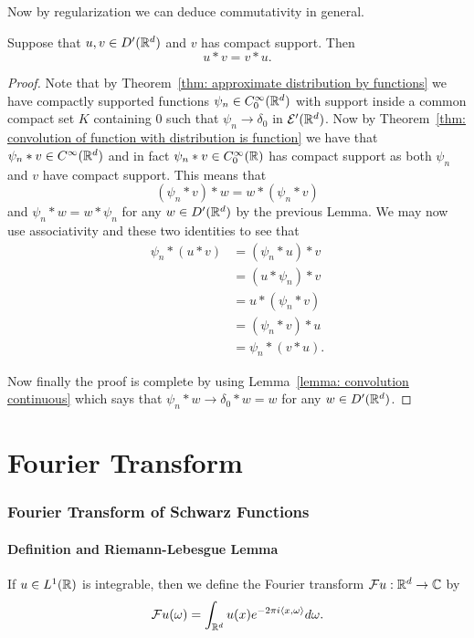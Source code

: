 \documentclass[twoside, a4paper, 10pt]{amsart}
\begin{document}
Now by regularization we can deduce commutativity in general.

\begin{thm}[Commutativity] Suppose that $u,v \in D'(\mathbb{R}^d)$ and $v$ has compact support. Then $$u*v = v*u.$$

\end{thm}

\begin{proof} Note that by Theorem~\ref{thm: approximate distribution by functions} we have compactly supported functions $\psi_n \in C_0^{\infty}(\mathbb{R}^d)$ with support inside a common compact set $K$ containing $0$ such that $\psi_n \to \delta_0$ in $\mathcal{E}'(\mathbb{R}^d)$. Now by Theorem~\ref{thm: convolution of function with distribution is function} we have that $\psi_n * v \in C^{\infty}(\mathbb{R}^d)$ and in fact $\psi_n * v \in C_0^{\infty}(\mathbb{R})$ has compact support as both $\psi_n$ and $v$ have compact support. This means that $$(\psi_n * v) *w = w * (\psi_n * v)$$ and $\psi_n * w = w * \psi_n$  for any $w \in D'(\mathbb{R}^d)$ by the previous Lemma. We may now use associativity and these two identities to see that 
\begin{align*} \psi_n * (u*v) &= (\psi_n * u) * v \\
&= (u * \psi_n) * v \\
&= u * (\psi_n * v) \\
&= (\psi_n * v) * u \\
&= \psi_n * (v * u). \end{align*}

Now finally the proof is complete by using Lemma~\ref{lemma: convolution continuous} which says that $\psi_n * w \to \delta_0 * w = w$ for any $w \in D'(\mathbb{R}^d)$. \end{proof}

\part{Fourier Transform}

\section{Fourier Transform of Schwarz Functions}

\subsection{Definition and Riemann-Lebesgue Lemma}

\begin{mydef}\label{def: fourier of integrable} If $u \in L^1(\mathbb{R})$ is integrable, then we define the Fourier transform $\mathcal{F}u:\mathbb{R}^d \to \mathbb{C}$ by $$\mathcal{F}u(\omega) = \int_{\mathbb{R}^d} u(x) e^{-2\pi i \langle x, \omega \rangle } d\omega.$$

\end{mydef}
\end{document}
